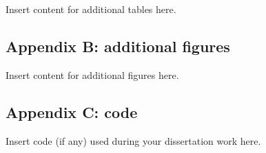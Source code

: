 \documentclass[
  12pt,
]{article}
\begin{document}
Insert content for additional tables here.

\newpage

\hypertarget{appendix-b-additional-figures}{%
\subsection{Appendix B: additional
figures}\label{appendix-b-additional-figures}}

Insert content for additional figures here.

\newpage

\hypertarget{appendix-c-code}{%
\subsection{Appendix C: code}\label{appendix-c-code}}

Insert code (if any) used during your dissertation work here.
\end{document}
